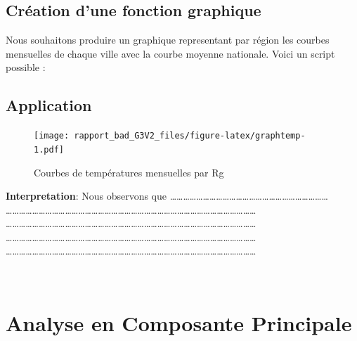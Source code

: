\documentclass[
]{article}
\begin{document}
\hypertarget{cruxe9ation-dune-fonction-graphique}{%
\subsection{\texorpdfstring{\textbf{Création d'une fonction
graphique}}{Création d'une fonction graphique}}\label{cruxe9ation-dune-fonction-graphique}}

Nous souhaitons produire un graphique representant par région les
courbes mensuelles de chaque ville avec la courbe moyenne nationale.
Voici un script possible :

\hypertarget{application}{%
\subsection{\texorpdfstring{\textbf{Application}}{Application}}\label{application}}

\begin{figure}
\centering
\texttt{[image: rapport\_bad\_G3V2\_files/figure-latex/graphtemp-1.pdf]}
\caption{Courbes de températures mensuelles par Rg}
\end{figure}

\textbf{Interpretation}: Nous observons que
\ldots\ldots\ldots\ldots\ldots\ldots\ldots\ldots\ldots\ldots\ldots\ldots\ldots\ldots\ldots\ldots\ldots\ldots\ldots\ldots\ldots\ldots\ldots\ldots{}\\
\ldots\ldots\ldots\ldots\ldots\ldots\ldots\ldots\ldots\ldots\ldots\ldots\ldots\ldots\ldots\ldots\ldots\ldots\ldots\ldots\ldots\ldots\ldots\ldots\ldots\ldots\ldots\ldots\ldots\ldots\ldots\ldots\ldots\ldots\ldots\ldots\ldots\ldots{}
\ldots\ldots\ldots\ldots\ldots\ldots\ldots\ldots\ldots\ldots\ldots\ldots\ldots\ldots\ldots\ldots\ldots\ldots\ldots\ldots\ldots\ldots\ldots\ldots\ldots\ldots\ldots\ldots\ldots\ldots\ldots\ldots\ldots\ldots\ldots\ldots\ldots\ldots{}
\ldots\ldots\ldots\ldots\ldots\ldots\ldots\ldots\ldots\ldots\ldots\ldots\ldots\ldots\ldots\ldots\ldots\ldots\ldots\ldots\ldots\ldots\ldots\ldots\ldots\ldots\ldots\ldots\ldots\ldots\ldots\ldots\ldots\ldots\ldots\ldots\ldots\ldots{}
\ldots\ldots\ldots\ldots\ldots\ldots\ldots\ldots\ldots\ldots\ldots\ldots\ldots\ldots\ldots\ldots\ldots\ldots\ldots\ldots\ldots\ldots\ldots\ldots\ldots\ldots\ldots\ldots\ldots\ldots\ldots\ldots\ldots\ldots\ldots\ldots\ldots\ldots{}

~

\hypertarget{analyse-en-composante-principale}{%
\section{\texorpdfstring{\textbf{Analyse en Composante Principale
}}{Analyse en Composante Principale }}\label{analyse-en-composante-principale}}
\end{document}
